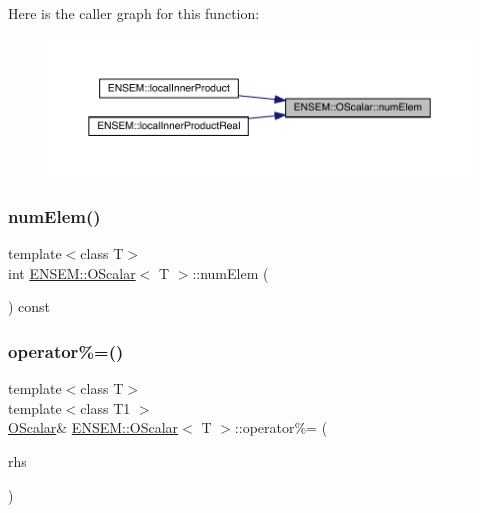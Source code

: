 Here is the caller graph for this function\+:\nopagebreak
\begin{figure}[H]
\begin{center}
\leavevmode
\includegraphics[width=350pt]{da/d80/classENSEM_1_1OScalar_aa9a7a2cddc34ba1add28369a764ced80_icgraph}
\end{center}
\end{figure}
\mbox{\label{classENSEM_1_1OScalar_aa9a7a2cddc34ba1add28369a764ced80}} 
\subsubsection{\texorpdfstring{numElem()}{numElem()}\hspace{0.1cm}{\footnotesize\ttfamily [2/2]}}
{\footnotesize\ttfamily template$<$class T$>$ \\
int \mbox{\hyperlink{classENSEM_1_1OScalar}{E\+N\+S\+E\+M\+::\+O\+Scalar}}$<$ T $>$\+::num\+Elem (\begin{DoxyParamCaption}{ }\end{DoxyParamCaption}) const\hspace{0.3cm}{\ttfamily [inline]}}

\mbox{\label{classENSEM_1_1OScalar_a89a76b1229e185250c0b9c48ae13d98b}} 
\subsubsection{\texorpdfstring{operator\%=()}{operator\%=()}\hspace{0.1cm}{\footnotesize\ttfamily [1/2]}}
{\footnotesize\ttfamily template$<$class T$>$ \\
template$<$class T1 $>$ \\
\mbox{\hyperlink{classENSEM_1_1OScalar}{O\+Scalar}}\& \mbox{\hyperlink{classENSEM_1_1OScalar}{E\+N\+S\+E\+M\+::\+O\+Scalar}}$<$ T $>$\+::operator\%= (\begin{DoxyParamCaption}\item[{const \mbox{\hyperlink{classENSEM_1_1OScalar}{O\+Scalar}}$<$ T1 $>$ \&}]{rhs }\end{DoxyParamCaption})\hspace{0.3cm}{\ttfamily [inline]}}



